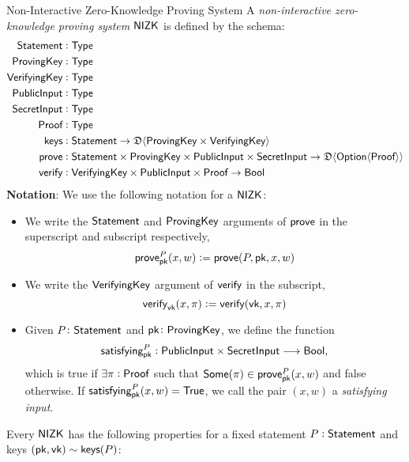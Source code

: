 \begin{definitiontoc}{Non-Interactive Zero-Knowledge Proving System}
    A \emph{non-interactive zero-knowledge proving system} ${\textsf{NIZK}}$ is defined by the schema:
    \begin{align*}
        {\textsf{Statement}}    &: {\textsf{Type}} \\
        {\textsf{ProvingKey}}   &: {\textsf{Type}} \\
        {\textsf{VerifyingKey}} &: {\textsf{Type}} \\
        {\textsf{PublicInput}}  &: {\textsf{Type}} \\
        {\textsf{SecretInput}}  &: {\textsf{Type}} \\
        {\textsf{Proof}}        &: {\textsf{Type}} \\
        {\textsf{keys}}         &: {\textsf{Statement}} \to \mathfrak{D}\langle{{\textsf{ProvingKey}}\times {\textsf{VerifyingKey}}}\rangle \\
        {\textsf{prove}}        &: {\textsf{Statement}} \times {\textsf{ProvingKey}} \times {\textsf{PublicInput}} \times {\textsf{SecretInput}} \to \mathfrak{D}\langle{{\textsf{Option}}\langle{{\textsf{Proof}}}\rangle}\rangle \\
        {\textsf{verify}}       &: {\textsf{VerifyingKey}} \times {\textsf{PublicInput}} \times {\textsf{Proof}} \to {\textsf{Bool}}
    \end{align*}
    \textbf{Notation}: We use the following notation for a ${\textsf{NIZK}}$:
    \begin{itemize}
        \item We write the ${\textsf{Statement}}$ and ${\textsf{ProvingKey}}$ arguments of ${\textsf{prove}}$ in the superscript and subscript respectively,
            \[{\textsf{prove}}^P_{\textsf{pk}}(x, w) := {\textsf{prove}}(P, {\textsf{pk}}, x, w)\]
        \item We write the ${\textsf{VerifyingKey}}$ argument of ${\textsf{verify}}$ in the subscript,
            \[{\textsf{verify}}_{\textsf{vk}}(x, \pi) := {\textsf{verify}}({\textsf{vk}}, x, \pi)\]
        \item Given $P \colon {\textsf{Statement}}$ and ${\textsf{pk}} \colon {\textsf{ProvingKey}}$, we define the function
        \begin{align*}
            {\textsf{satisfying}}^P_{\textsf{pk}} : {\textsf{PublicInput}} \times {\textsf{SecretInput}} \longrightarrow {\textsf{Bool}}, 
        \end{align*}
        which is true if $\exists \pi : {\textsf{Proof}}$ such that ${\textsf{Some}}(\pi) \in {\textsf{prove}}^P_{\textsf{pk}}(x, w)$ and false otherwise. If ${\textsf{satisfying}}^P_{\textsf{pk}} (x, w) = {\textsf{True}}$, we call the pair $(x,w)$ a \emph{satisfying input}.
    \end{itemize}

    Every ${\textsf{NIZK}}$ has the following properties for a fixed statement $P : {\textsf{Statement}}$ and keys $({\textsf{pk}}, {\textsf{vk}}) \sim {\textsf{keys}}(P)$:


\end{definitiontoc}
